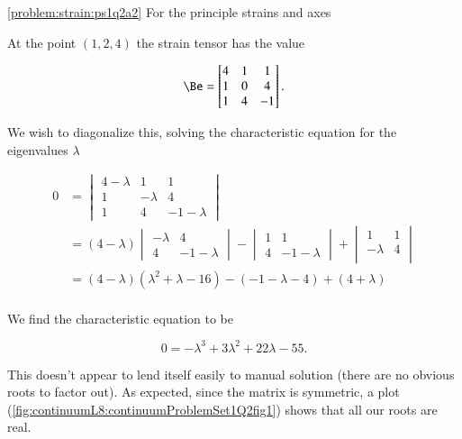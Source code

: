 \begin{Answer}[ref={problem:strain:ps1q2a}]
\ref{problem:strain:ps1q2a2} For the principle strains and axes

At the point $(1, 2, 4)$ the strain tensor has the value

\begin{equation}\label{eqn:continuumProblemSet1:270}
\Be =
\begin{bmatrix}
4 & 1 & 1 \\
1 & 0 & 4 \\
1 & 4 & -1
\end{bmatrix}.
\end{equation}

We wish to diagonalize this, solving the characteristic equation for the eigenvalues $\lambda$

\begin{align*}
0 &=
\begin{vmatrix}
4 -\lambda & 1 & 1 \\
1 & -\lambda & 4 \\
1 & 4 & -1 -\lambda
\end{vmatrix} \\
&=
(4 -\lambda )
\begin{vmatrix}
 -\lambda & 4 \\
 4 & -1 -\lambda
\end{vmatrix}
-
\begin{vmatrix}
1 & 1 \\
4 & -1 -\lambda
\end{vmatrix}
+
\begin{vmatrix}
1 & 1 \\
-\lambda & 4 \\
\end{vmatrix} \\
&=
(4 - \lambda)(\lambda^2 + \lambda - 16)
-(-1 -\lambda - 4)
+(4 + \lambda) \\
\end{align*}

We find the characteristic equation to be

\begin{equation}\label{eqn:continuumProblemSet1:290}
0 = -\lambda^3 + 3 \lambda^2 + 22\lambda - 55.
\end{equation}

This doesn't appear to lend itself easily to manual solution (there are no obvious roots to factor out).  As expected, since the matrix is symmetric, a plot (\ref{fig:continuumL8:continuumProblemSet1Q2fig1}) shows that all our roots are real.



\end{Answer}

